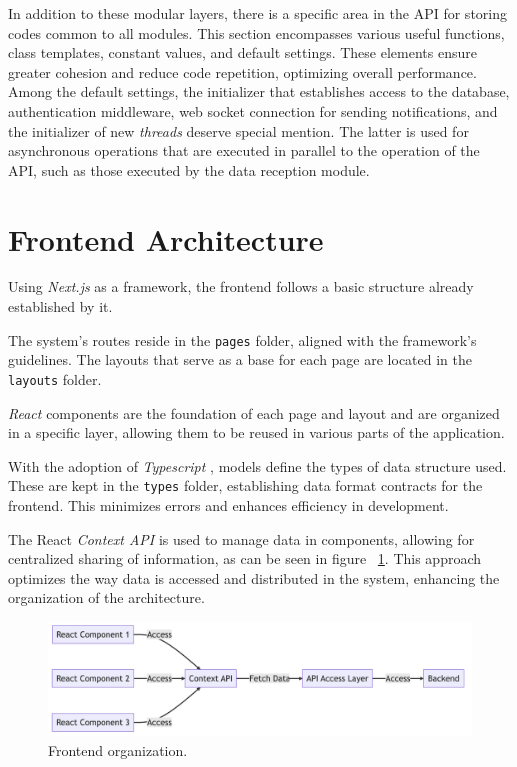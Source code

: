 In addition to these modular layers, there is a specific area in the \gls{API} for storing codes common to all modules. This section encompasses various useful functions, class templates, constant values, and default settings. These elements ensure greater cohesion and reduce code repetition, optimizing overall performance. Among the default settings, the initializer that establishes access to the database, authentication middleware, web socket connection for sending notifications, and the initializer of new \textit{threads} deserve special mention. The latter is used for asynchronous operations that are executed in parallel to the operation of the \gls{API}, such as those executed by the data reception module.

\section[Frontend Architecture]{Frontend Architecture}\label{sec:archFront}
Using \textit{Next.js} \cite{nextjsDocs} as a framework, the frontend follows a basic structure already established by it.

The system's routes reside in the \texttt{pages} folder, aligned with the framework's guidelines. The layouts that serve as a base for each page are located in the \texttt{layouts} folder.

\textit{React} components \cite{reactDocs} are the foundation of each page and layout and are organized in a specific layer, allowing them to be reused in various parts of the application.

With the adoption of \textit{Typescript} \cite{typescriptLang}, models define the types of data structure used. These are kept in the \texttt{types} folder, establishing data format contracts for the frontend. This minimizes errors and enhances efficiency in development.

The React \textit{Context API} is used to manage data in components, allowing for centralized sharing of information, as can be seen in figure ~\ref{fig:FrontendOrganization}. This approach optimizes the way data is accessed and distributed in the system, enhancing the organization of the architecture.

\begin{figure}[htbp]
	\centering
	\includegraphics[width=\textwidth]{images/components_frontend.png}
	\caption{Frontend organization.}
	\label{fig:FrontendOrganization}
\end{figure}

